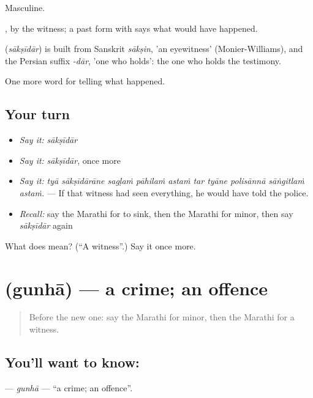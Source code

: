Masculine.

, by the witness; a past form with  says what would have happened.

\begin{cousinweb}
\textbf{} (\emph{sākṣīdār}) is built from Sanskrit \emph{sākṣin}, 'an eyewitness' (Monier-Williams), and the Persian suffix \emph{-dār}, 'one who holds': the one who holds the testimony.
\end{cousinweb}

\begin{grammarlens}[title={What you've built}]
One more word for telling what happened.
\end{grammarlens}

\subsection*{Your turn}
\begin{itemize}
\raggedright
  \item \emph{Say it:} \emph{sākṣīdār}
  \item \emph{Say it:} \emph{sākṣīdār}, once more
  \item \emph{Say it:} \emph{tyā sākṣīdārāne sagḷaṁ pāhilaṁ astaṁ tar tyāne polisānnā sāṅgitlaṁ astaṁ.} — If that witness had seen everything, he would have told the police.
  \item \emph{Recall:} say the Marathi for to sink, then the Marathi for minor, then say \emph{sākṣīdār} again
\end{itemize}

\begin{tcolorbox}[breakable,colback=teal!4,colframe=teal!35!black,title={Before you move on}]
What does  mean? (\textquotedblleft{}A witness\textquotedblright{}.) Say it once more.
\end{tcolorbox}
\section[\texorpdfstring{\mr{गुन्हा} (gunhā)}{गुन्हा (gunhā)}]{ (gunhā) — a crime; an offence}

\label{lesson:MR-C289-gunha}



\begin{quote}
Before the new one: say the Marathi for minor, then the Marathi for a witness.
\end{quote}

\subsection*{You'll want to know: }
\textbf{} — \emph{gunhā} — \textquotedblleft{}a crime; an offence\textquotedblright{}.

